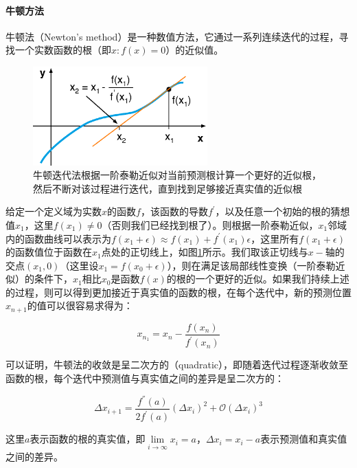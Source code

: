 \paragraph{牛顿方法}
牛顿法（Newton's method）是一种数值方法，它通过一系列连续迭代的过程，寻找一个实数函数的根（即$x:f(x)=0$）的近似值。

\begin{figure}
	\sidecaption
	\includegraphics[width=0.6\textwidth]{figures/mlt/Newton-method}
	\caption{牛顿迭代法根据一阶泰勒近似对当前预测根计算一个更好的近似根，然后不断对该过程进行迭代，直到找到足够接近真实值的近似根}
	\label{f:mlt-Newton-method}
\end{figure}

给定一个定义域为实数$x$的函数$f$，该函数的导数$f^{'}$，以及任意一个初始的根的猜想值$x_1$，这里$f(x_1)\neq 0$（否则我们已经找到根了）。则根据一阶泰勒近似，$x_1$邻域内的函数曲线可以表示为$f(x_1+\epsilon)\approx f(x_1)+f^{'}(x_1)\epsilon$，这里所有$f(x_1+\epsilon)$的函数值位于函数在$x_1$点处的正切线上，如图\ref{f:mlt-Newton-method}所示。我们取该正切线与$x-$轴的交点$(x_1,0)$（这里设$x_1=f(x_0+\epsilon)$），则在满足该局部线性变换（一阶泰勒近似）的条件下，$x_1$相比$x_0$是函数$f(x)$的根的一个更好的近似。如果我们持续上述的过程，则可以得到更加接近于真实值的函数的根，在每个迭代中，新的预测位置$x_{n+1}$的值可以很容易求得为：

\begin{equation}
	x_{n_1}=x_n-\frac{f(x_n)}{f^{'}(x_n)}
\end{equation}

可以证明，牛顿法的收敛是呈二次方的（quadratic），即随着迭代过程逐渐收敛至函数的根，每个迭代中预测值与真实值之间的差异是呈二次方的：

\begin{equation}
	\Delta x_{i+1}=\frac{f^{''}(a)}{2f^{'}(a)}(\Delta x_i)^{2}+\mathcal{O}(\Delta x_i)^{3}
\end{equation}

\noindent 这里$a$表示函数的根的真实值，即$\lim\limits_{i\to\infty}x_i=a$，$\Delta x_i=x_i-a$表示预测值和真实值之间的差异。

